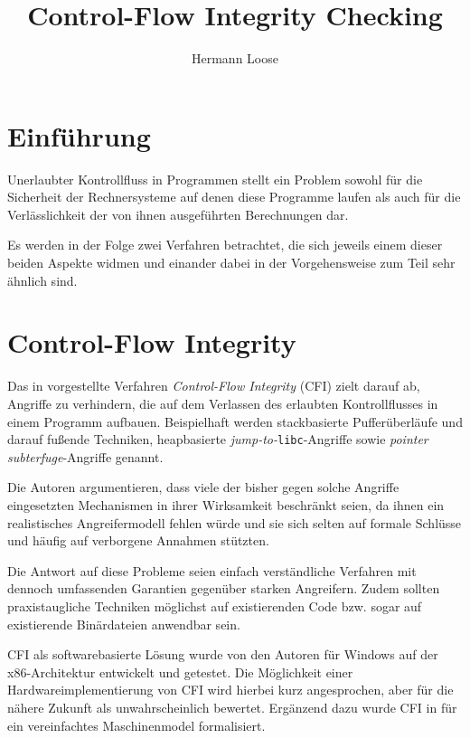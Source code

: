 \documentclass[11pt]{article}
\title{Control-Flow Integrity Checking}
\author{Hermann Loose}
\begin{document}
\maketitle

\section{Einführung}

Unerlaubter Kontrollfluss in Programmen stellt ein Problem sowohl für die
Sicherheit der Rechnersysteme auf denen diese Programme laufen als auch für die
Verlässlichkeit der von ihnen ausgeführten Berechnungen dar.

Es werden in der Folge zwei Verfahren betrachtet, die sich jeweils einem dieser
beiden Aspekte widmen und einander dabei in der Vorgehensweise zum Teil sehr
ähnlich sind.

\section{Control-Flow Integrity}

Das in \cite{abadi-2005-control-msr} vorgestellte Verfahren \emph{Control-Flow
Integrity} (CFI) zielt darauf ab, Angriffe zu verhindern, die auf dem Verlassen
des erlaubten Kontrollflusses in einem Programm aufbauen. Beispielhaft werden
stackbasierte Pufferüberläufe und darauf fußende Techniken, heapbasierte
\emph{jump-to-}\texttt{libc}-Angriffe sowie \emph{pointer subterfuge}-Angriffe
genannt.

Die Autoren argumentieren, dass viele der bisher gegen solche Angriffe
eingesetzten Mechanismen in ihrer Wirksamkeit beschränkt seien, da ihnen ein
realistisches Angreifermodell fehlen würde und sie sich selten auf formale
Schlüsse und häufig auf verborgene Annahmen stützten.

Die Antwort auf diese Probleme seien einfach verständliche Verfahren mit
dennoch umfassenden Garantien gegenüber starken Angreifern. Zudem sollten
praxistaugliche Techniken möglichst auf existierenden Code bzw. sogar auf
existierende Binärdateien anwendbar sein.

CFI als softwarebasierte Lösung wurde von den Autoren für Windows auf der
x86-Architektur entwickelt und getestet. Die Möglichkeit einer
Hardwareimplementierung von CFI wird hierbei kurz angesprochen, aber für die
nähere Zukunft als unwahrscheinlich bewertet. Ergänzend dazu wurde CFI in
\cite{abadi-2005-theory-fmse} für ein vereinfachtes Maschinenmodel
formalisiert.
\end{document}
